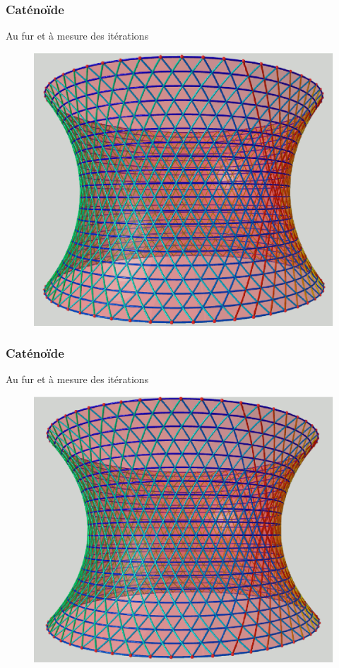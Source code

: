 \documentclass{beamer}
\begin{document}
\begin{frame}
\frametitle{Caténoïde}
Au fur et à mesure des itérations
\begin{figure}[h!]
      \centering 
      \includegraphics[scale=0.31]{catenoide/catenoide-5.eps}
\end{figure}
\end{frame}

\begin{frame}
\frametitle{Caténoïde}
Au fur et à mesure des itérations
\begin{figure}[h!]
      \centering 
      \includegraphics[scale=0.31]{catenoide/catenoide-6.eps}
\end{figure}
\end{frame}
\end{document}
